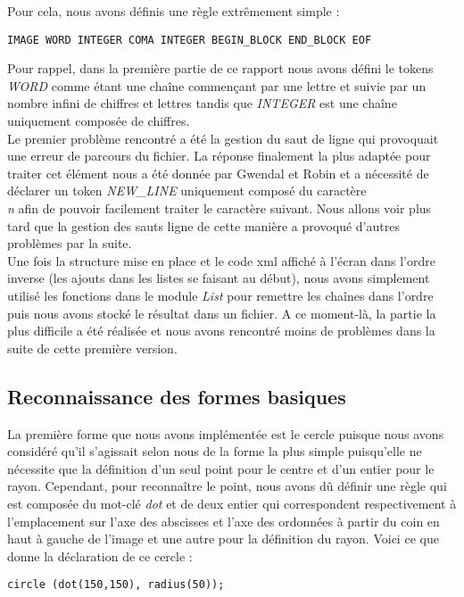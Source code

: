 		Pour cela, nous avons définis une règle extrêmement simple : 
		
\begin{lstlisting}[morekeywords={IMAGE,WORD,INTEGER,COMA,BEGIN_BLOCK,END_BLOCK,EOF}]
IMAGE WORD INTEGER COMA INTEGER BEGIN_BLOCK END_BLOCK EOF
\end{lstlisting}
		
		Pour rappel, dans la première partie de ce rapport nous avons défini le tokens \emph{WORD} comme étant une chaîne commençant par une lettre et suivie par un nombre infini de chiffres et lettres tandis que \emph{INTEGER} est une chaîne uniquement composée de chiffres.\\
		
		Le premier problème rencontré a été la gestion du saut de ligne qui provoquait une erreur de parcours du fichier. La réponse finalement la plus adaptée pour traiter cet élément nous a été donnée par Gwendal et Robin et a nécessité de déclarer un token \emph{NEW\_LINE} uniquement composé du caractère \emph{\\n} afin de pouvoir facilement traiter le caractère suivant. Nous allons voir plus tard que la gestion des sauts ligne de cette manière a provoqué d'autres problèmes par la suite. \\
		
		Une fois la structure mise en place et le code xml affiché à l'écran dans l'ordre inverse (les ajouts dans les listes se faisant au début), nous avons simplement utilisé les fonctions dans le module \emph{List} pour remettre les chaînes dans l'ordre puis nous avons stocké le résultat dans un fichier. A ce moment-là, la partie la plus difficile a été réalisée et nous avons rencontré moins de problèmes dans la suite de cette première version.
		
		
		\subsection{Reconnaissance des formes basiques}
		La première forme que nous avons implémentée est le cercle puisque nous avons considéré qu'il s'agissait selon nous de la forme la plus simple puisqu'elle ne nécessite que la définition d'un seul point pour le centre et d'un entier pour le rayon. Cependant, pour reconnaître le point, nous avons dû définir une règle qui est composée du mot-clé \emph{dot} et de deux entier qui correspondent respectivement à l'emplacement sur l'axe des abscisses et l'axe des ordonnées à partir du coin en haut à gauche de l'image et une autre pour la définition du rayon. Voici ce que donne la déclaration de ce cercle :
\begin{lstlisting}[morekeywords={circle, dot, radius}]
circle (dot(150,150), radius(50));
\end{lstlisting}

